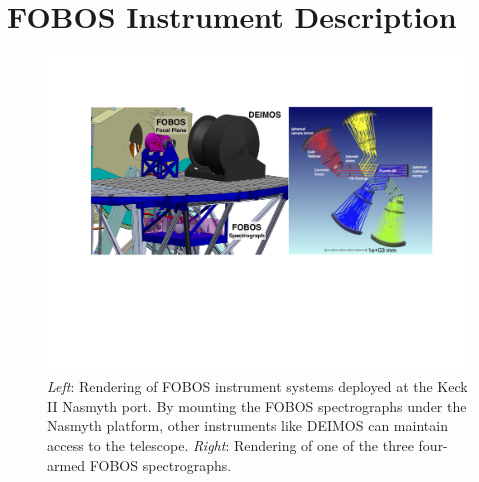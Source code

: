 

\section{FOBOS Instrument Description}
\label{sec:concept}


\begin{figure}[h!]
%
\vskip -0.1in
%
\includegraphics[width=\textwidth]{figs/FOBOS_inst.pdf}
%
\caption{\small {\it Left}: Rendering of FOBOS instrument systems
deployed at the Keck II Nasmyth port.  By mounting the FOBOS
spectrographs under the Nasmyth platform, other instruments like DEIMOS
can maintain access to the telescope. {\it Right}: Rendering of one of
the three four-armed FOBOS spectrographs.}
%
\label{fig:layout}
%
\end{figure}

